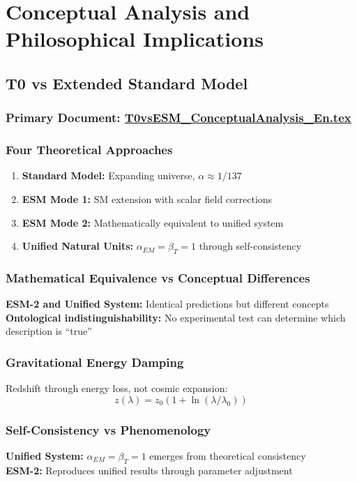 \documentclass[12pt,a4paper]{report}
\begin{document}
	\chapter{Conceptual Analysis and Philosophical Implications}
	
	\section{T0 vs Extended Standard Model}
	\subsection{Primary Document: \href{https://github.com/jpascher/T0-Time-Mass-Duality/tree/main/2/pdf/T0vsESM_ConceptualAnalysis_En.pdf}{T0vsESM\_ConceptualAnalysis\_En.tex}}
	
	\subsection{Four Theoretical Approaches}
	\begin{enumerate}
		\item \textbf{Standard Model:} Expanding universe, $\alpha \approx 1/137$
		\item \textbf{ESM Mode 1:} SM extension with scalar field corrections
		\item \textbf{ESM Mode 2:} Mathematically equivalent to unified system
		\item \textbf{Unified Natural Units:} $\alpha_{EM} = \beta_T = 1$ through self-consistency
	\end{enumerate}
	
	\subsection{Mathematical Equivalence vs Conceptual Differences}
	\textbf{ESM-2 and Unified System:} Identical predictions but different concepts\\
	\textbf{Ontological indistinguishability:} No experimental test can determine which 
	description is ``true''
	
	\subsection{Gravitational Energy Damping}
	Redshift through energy loss, not cosmic expansion:
	$$z(\lambda) = z_0(1 + \ln(\lambda/\lambda_0))$$
	
	\subsection{Self-Consistency vs Phenomenology}
	\textbf{Unified System:} $\alpha_{EM} = \beta_T = 1$ emerges from theoretical consistency\\
	\textbf{ESM-2:} Reproduces unified results through parameter adjustment
	
\end{document}

